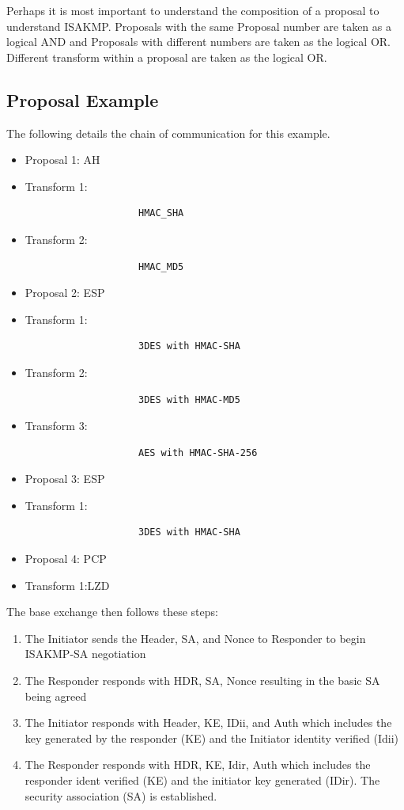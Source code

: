 \documentclass{article}
\begin{document}
Perhaps it is most important to understand the composition of a proposal to understand ISAKMP. Proposals with the same Proposal number are taken as a logical AND and Proposals with different numbers are taken as the logical OR. Different transform within a proposal are taken as the logical OR. 

\subsection {Proposal Example}

The following details the chain of communication for this example. 

\begin{itemize}
\item Proposal 1: AH
\item Transform 1: \begin{verbatim}
					HMAC_SHA
					\end{verbatim}	 
\item Transform 2: \begin{verbatim}
					HMAC_MD5
					\end{verbatim}
\item Proposal 2: ESP
\item Transform 1: \begin{verbatim}
					3DES with HMAC-SHA
					\end{verbatim}
\item Transform 2: \begin{verbatim}
					3DES with HMAC-MD5
					\end{verbatim}
\item Transform 3: \begin{verbatim}
					AES with HMAC-SHA-256
					\end{verbatim}
\item Proposal 3: ESP
\item Transform 1: \begin{verbatim}
					3DES with HMAC-SHA
					\end{verbatim}
\item Proposal 4: PCP
\item Transform 1:LZD
\end{itemize}

The base exchange then follows these steps:

\begin{enumerate}
\item The Initiator sends the Header, SA, and Nonce to Responder to begin ISAKMP-SA negotiation
\item The Responder responds with HDR, SA, Nonce resulting in the basic SA being agreed 
\item The Initiator responds with Header, KE, IDii, and Auth which includes the key generated by the responder (KE) and the Initiator identity verified (Idii)
\item The Responder responds with HDR, KE, Idir, Auth which includes the responder ident verified (KE) and the initiator key generated (IDir). The security association (SA) is established. 
\end{enumerate}
\end{document}
